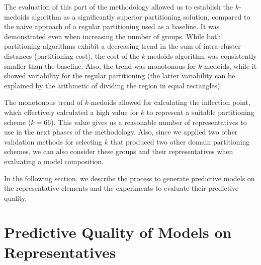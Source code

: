 The evaluation of this part of the methodology allowed us to establish the $k$-medoids algorithm as a significantly superior partitioning solution, compared to the naive approach of a regular partitioning used as a baseline. It was demonstrated even when increasing the number of groups. While both partitioning algorithms exhibit a decreasing trend in the sum of intra-cluster distances (partitioning cost), the cost of the $k$-medoids algorithm was consistently smaller than the baseline. Also, the trend was monotonous for $k$-medoids, while it showed variability for the regular partitioning (the latter variability can be explained by the arithmetic of dividing the region in equal rectangles). 

The monotonous trend of $k$-medoids allowed for calculating the inflection point, which effectively calculated a high value for $k$ to represent a suitable partitioning scheme ($k = 66$). This value gives us a reasonable number of representatives to use in the next phases of the methodology. Also, since we applied two other validation methods for selecting $k$ that produced two other domain partitioning schemes, we can also consider these groups and their representatives when evaluating a model composition. 



In the following section, we describe the process to generate predictive models on the representative elements and the experiments to evaluate their predictive quality.

\section{Predictive Quality of Models on Representatives}
\label{Sec:AnalyzePredictorRepresentatives}

